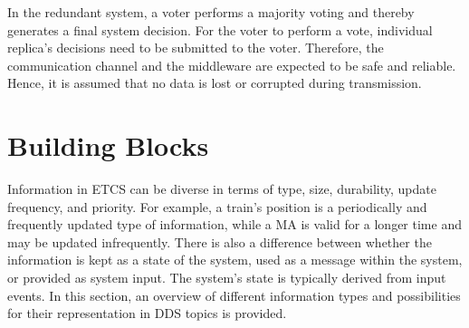 In the redundant system, a voter performs a majority voting and thereby generates a final system decision.
For the voter to perform a vote, individual replica's decisions need to be submitted to the voter.
Therefore, the communication channel and the  middleware are expected to be safe and reliable.
Hence, it is assumed that no data is lost or corrupted during transmission.

\section{ Building Blocks}

Information in \gls*{ETCS} can be diverse in terms of type, size, durability, update frequency, and priority.
For example, a train's position is a periodically and frequently updated type of information, while a \gls*{MA} is valid for a longer time and may be updated infrequently.
There is also a difference between whether the information is kept as a state of the system, used as a message within the system, or provided as system input.
The system's state is typically derived from input events.
In this section, an overview of different information types and possibilities for their representation in \gls*{DDS} topics is provided.

